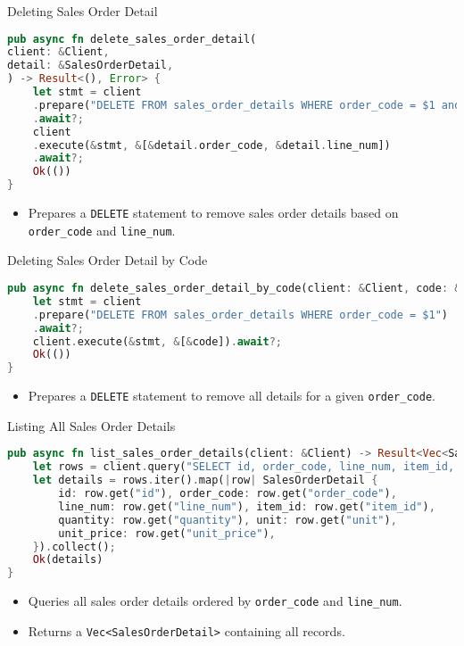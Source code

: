\documentclass[aspectratio=169, table]{beamer}
\begin{document}
\begin{frame}[fragile]{Deleting Sales Order Detail}
\vspace{15pt}
\begin{lstlisting}[language=Rust]
pub async fn delete_sales_order_detail(
client: &Client,
detail: &SalesOrderDetail,
) -> Result<(), Error> {
	let stmt = client
	.prepare("DELETE FROM sales_order_details WHERE order_code = $1 and line_num = $2")
	.await?;
	client
	.execute(&stmt, &[&detail.order_code, &detail.line_num])
	.await?;
	Ok(())
}
\end{lstlisting}
\begin{itemize}
\item Prepares a \texttt{DELETE} statement to remove sales order details based on \texttt{order\_code} and \texttt{line\_num}.
\end{itemize}
\end{frame}

\begin{frame}[fragile]{Deleting Sales Order Detail by Code}
\begin{lstlisting}[language=Rust]
pub async fn delete_sales_order_detail_by_code(client: &Client, code: &str) -> Result<(), Error> {
	let stmt = client
	.prepare("DELETE FROM sales_order_details WHERE order_code = $1")
	.await?;
	client.execute(&stmt, &[&code]).await?;
	Ok(())
}
\end{lstlisting}
\begin{itemize}
\item Prepares a \texttt{DELETE} statement to remove all details for a given \texttt{order\_code}.
\end{itemize}
\end{frame}

\begin{frame}[fragile]{Listing All Sales Order Details}
\vspace{15pt}
\begin{lstlisting}[language=Rust]
pub async fn list_sales_order_details(client: &Client) -> Result<Vec<SalesOrderDetail>, Error> {
	let rows = client.query("SELECT id, order_code, line_num, item_id, quantity, unit, unit_price FROM sales_order_details ORDER BY order_code, line_num", &[],).await?;
	let details = rows.iter().map(|row| SalesOrderDetail {
		id: row.get("id"), order_code: row.get("order_code"),
		line_num: row.get("line_num"), item_id: row.get("item_id"),
		quantity: row.get("quantity"), unit: row.get("unit"),
		unit_price: row.get("unit_price"),
	}).collect();
	Ok(details)
}
\end{lstlisting}
\begin{itemize}
\item Queries all sales order details ordered by \texttt{order\_code} and \texttt{line\_num}.
\item Returns a \texttt{Vec<SalesOrderDetail>} containing all records.
\end{itemize}
\end{frame}
\end{document}
